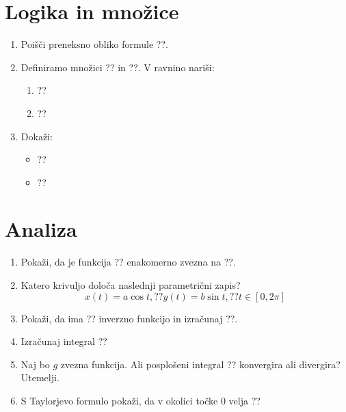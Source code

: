 \documentclass[a4paper,12pt]{article}
\begin{document}

\section*{Logika in množice}

\begin{enumerate}
\item
Poišči preneksno obliko formule ??.

\item
Definiramo množici ?? in ??.
V ravnino nariši:
\begin{enumerate}
\item ??
\item ??
\end{enumerate}

\item
Dokaži:
\begin{itemize}
\item ??
\item ??
\end{itemize}
\end{enumerate}

\section*{Analiza}

\begin{enumerate}
\item
Pokaži, da je funkcija ?? enakomerno zvezna na ??.

\item
Katero krivuljo določa naslednji parametrični zapis?
\[
x(t) = a \cos t, ?? %
y(t) = b \sin t, ?? %
t \in [0, 2 \pi]
\]

\item
Pokaži, da ima ?? inverzno funkcijo in izračunaj ??.

\item
Izračunaj integral
??

\item
Naj bo \(g\) zvezna funkcija. Ali posplošeni integral
??
konvergira ali divergira? Utemelji.

\item
S Taylorjevo formulo pokaži, da v okolici točke \(0\) velja
??
\end{enumerate}
\end{document}
